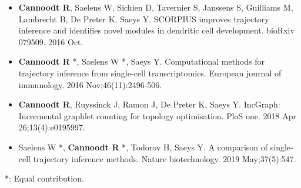 \begin{itemize}
	\item \textbf{Cannoodt R}, Saelens W, Sichien D, Tavernier S, Janssens S, Guilliams M, Lambrecht B, De Preter K, Saeys Y. SCORPIUS improves trajectory inference and identifies novel modules in dendritic cell development. bioRxiv 079509. 2016 Oct.
	\item \textbf{Cannoodt R} *, Saelens W *, Saeys Y. Computational methods for trajectory inference from single-cell transcriptomics. European journal of immunology. 2016 Nov;46(11):2496-506.
	\item \textbf{Cannoodt R}, Ruyssinck J, Ramon J, De Preter K, Saeys Y. IncGraph: Incremental graphlet counting for topology optimisation. PloS one. 2018 Apr 26;13(4):e0195997.
	\item Saelens W *, \textbf{Cannoodt R} *, Todorov H, Saeys Y. A comparison of single-cell trajectory inference methods. Nature biotechnology. 2019 May;37(5):547.
\end{itemize}

*: Equal contribution.

